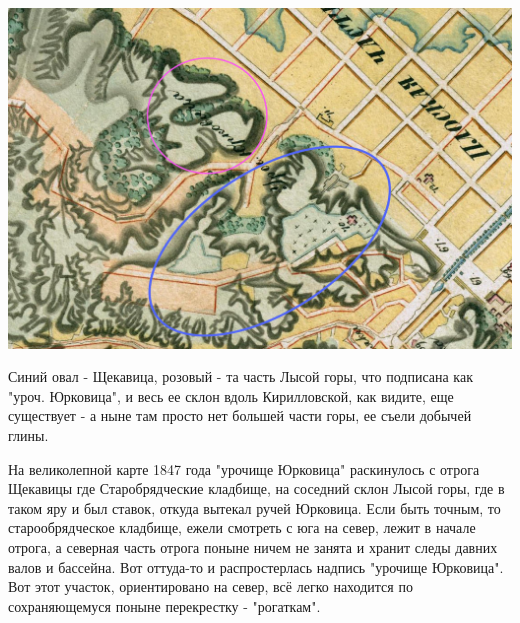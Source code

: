\begin{center}
\includegraphics[width=\linewidth]{chast-kirvys/poisk-yourk/1845-marked.jpg}
\end{center} 

Синий овал - Щекавица, розовый - та часть Лысой горы, что подписана как "уроч. Юрковица", и весь ее склон вдоль Кирилловской, как видите, еще существует - а ныне там просто нет большей части горы, ее съели добычей глины.

На великолепной карте 1847 года "урочище Юрковица" раскинулось с отрога Щекавицы где Старобрядческие кладбище, на соседний склон Лысой горы, где в таком яру и был ставок, откуда вытекал ручей Юрковица. Если быть точным, то старообрядческое кладбище, ежели смотреть с юга на север, лежит в начале отрога, а северная часть отрога поныне ничем не занята и хранит следы давних валов и бассейна. Вот оттуда-то и распростерлась надпись "урочище Юрковица". Вот этот участок, ориентировано на север, всё легко находится по сохраняющемуся поныне перекрестку - "рогаткам".


